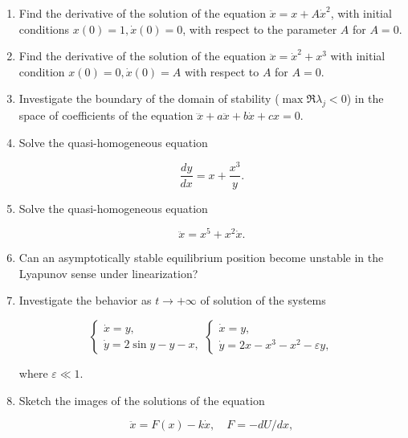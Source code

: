 \documentclass{article}
\begin{document}
\begin{enumerate}
\item Find the derivative of the solution of the equation
  $\ddot x = x + A\dot x^2$, with initial conditions $x(0) = 1, \dot x(0) = 0$,
  with respect to the parameter $A$ for $A = 0$.

\item Find the derivative of the solution of the equation
  $\ddot x = \dot x^2 + x^3$ with initial condition $x(0) = 0, \dot x(0) = A$
  with respect to $A$ for $A = 0$.

\item Investigate the boundary of the domain of stability
  ($\max \Re \lambda_j < 0$) in the space of coefficients of the equation
  $\dddot x + a \ddot x + b \dot x + cx = 0$.

\item Solve the quasi-homogeneous equation

  \begin{equation*}
    \frac{dy}{dx} = x + \frac{x^3}{y} .
  \end{equation*}

\item Solve the quasi-homogeneous equation

  \begin{equation*}
    \ddot x = x^5 + x^2 \dot x .
  \end{equation*}

\item Can an asymptotically stable equilibrium position become unstable in the
  Lyapunov sense under linearization?

\item Investigate the behavior as $t \rightarrow + \infty$ of solution of the systems

  \begin{equation*}
    \begin{cases}
      \dot x = y, \\
      \dot y = 2\sin y - y - x,
    \end{cases}
    \begin{cases}
      \dot x = y, \\
      \dot y = 2x - x^3 - x^2 - \varepsilon y,
    \end{cases}
  \end{equation*}

  where $\varepsilon \ll 1$.

\item Sketch the images of the solutions of the equation

  \begin{equation*}
    \ddot x = F(x) - k\dot x, \quad F = -dU/dx,
  \end{equation*}


\end{enumerate}
\end{document}
